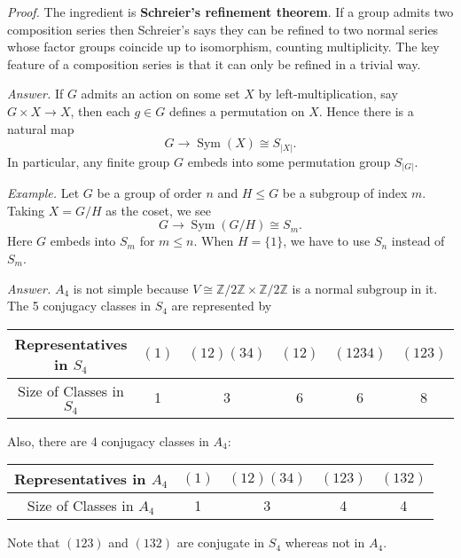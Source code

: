 \documentclass{mathproblems}
\newcommand\Z{\mathbb{Z}}
\begin{document}
\begin{questions}
\textit{Proof.} The ingredient is {\color{violet} \textbf{Schreier’s refinement theorem}}. If a group admits two composition series then Schreier’s says they can be refined to two normal series whose factor groups coincide up to isomorphism, counting multiplicity. The key feature of a composition series is that it can only be refined in a trivial way.



\textit{Answer.} If $G$ admits an action on some set $X$ by left-multiplication, say $G\times X\to X$, then each $g\in G$ defines a permutation on $X$. Hence there is a natural map
$$
G\longrightarrow \operatorname{Sym}(X)\cong S_{|X|}.
$$
In particular, any finite group $G$ embeds into some permutation group $S_{|G|}$.

\textit{Example.} Let $G$ be a group of order $n$ and $H\leqslant G$ be a subgroup of index $m$. Taking $X=G/H$ as the coset, we see
$$
G\longrightarrow \operatorname{Sym}(G/H)\cong S_m.
$$
Here $G$ embeds into $S_m$ for $m\leqslant n$. When $H=\{1\}$, we have to use $S_n$ instead of $S_m$.


\textit{Answer.} $A_4$ is not simple because $V\cong \Z/2\Z\times \Z/2\Z$ is a normal subgroup in it. The 5 conjugacy classes in $S_4$ are represented by
\begin{center}
\begin{tabular}{c|ccccc}
Representatives in $S_4$ & $(1)$ & $(12)(34)$ & $(12)$ & $(1234)$ & $(123)$ \\
\hline Size of Classes in $S_4$ & 1 & 3 & 6 & 6 & 8
\end{tabular}
\end{center}
Also, there are 4 conjugacy classes in $A_4$:
\begin{center}
\begin{tabular}{c|cccc}
Representatives in $A_4$ & $(1)$ & $(12)(34)$ & $(123)$ & $(132)$ \\
\hline Size of Classes in $A_4$ & 1 & 3 & 4 & 4
\end{tabular}
\end{center}
Note that $(123)$ and $(132)$ are conjugate in $S_4$ whereas not in $A_4$.



\end{questions}
\end{document}
